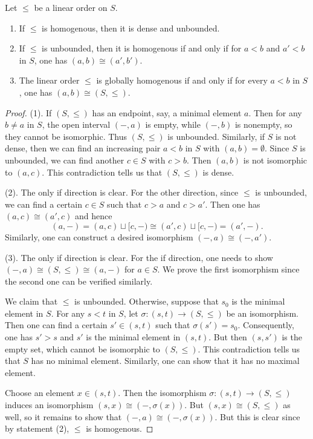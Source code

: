 \documentclass[10pt,a4paper]{amsart}
\begin{document}
\begin{lemma} \label{unbounded and dense}
Let $\leqslant$ be a linear order on $S$.
\begin{enumerate}
\item If $\leqslant$ is homogenous, then it is dense and unbounded.

\item If $\leqslant$ is unbounded, then it is homogenous if and only if for $a < b$ and $a' < b$ in $S$, one has $(a, b) \cong (a', b')$.

\item The linear order $\leqslant$ is globally homogenous if and only if for every $a < b$ in $S$, one has $(a, b) \cong (S, \leqslant)$.
\end{enumerate}
\end{lemma}

\begin{proof}
(1). If $(S, \leqslant)$ has an endpoint, say, a minimal element $a$. Then for any $b \neq a$ in $S$, the open interval $(-, a)$ is empty, while $(-, b)$ is nonempty, so they cannot be isomorphic. Thus $(S, \leqslant)$ is unbounded. Similarly, if $S$ is not dense, then we can find an increasing pair $a < b$ in $S$ with $(a, b) = \emptyset$. Since $S$ is unbounded, we can find another $c \in S$ with $c > b$. Then $(a, b)$ is not isomorphic to $(a, c)$. This contradiction tells us that $(S, \leqslant)$ is dense.

(2). The only if direction is clear. For the other direction, since $\leqslant$ is unbounded, we can find a certain $c \in S$ such that $c > a$ and $c > a'$. Then one has $(a, c) \cong (a', c)$ and hence
\[
(a, -) = (a, c) \sqcup [c, -) \cong (a', c) \sqcup [c, -) = (a', -).
\]
Similarly, one can construct a desired isomorphism $(-, a) \cong (-, a')$.

(3). The only if direction is clear. For the if direction, one needs to show $(-, a) \cong (S, \leqslant) \cong (a, -)$ for $a \in S$. We prove the first isomorphism since the second one can be verified similarly.

We claim that $\leqslant$ is unbounded. Otherwise, suppose that $s_0$ is the minimal element in $S$. For any $s < t$ in $S$, let $\sigma: (s, t) \to (S, \leqslant)$ be an isomorphism. Then one can find a certain $s' \in (s, t)$ such that $\sigma(s') = s_0$. Consequently, one has $s' > s$ and $s'$ is the minimal element in $(s, t)$. But then $(s, s')$ is the empty set, which cannot be isomorphic to $(S, \leqslant)$. This contradiction tells us that $S$ has no minimal element. Similarly, one can show that it has no maximal element.

Choose an element $x \in (s, t)$. Then the isomorphism $\sigma: (s, t) \to (S, \leqslant)$ induces an isomorphism $(s, x) \cong (-, \sigma(x))$. But $(s, x) \cong (S, \leqslant)$ as well, so it remains to show that $(-, a) \cong (-, \sigma(x))$. But this is clear since by statement (2), $\leqslant$ is homogenous.
\end{proof}
\end{document}

